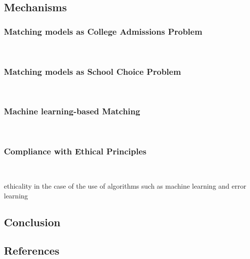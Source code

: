 \documentclass[letterpaper]{article} %
\begin{document}
    \subsection{Mechanisms}

    \subsubsection{Matching models as College Admissions Problem}~\citet{basshuysen}

    \subsubsection{Matching models as School Choice Problem}~\citet{basshuysen}

    \subsubsection{Machine learning-based Matching}~\citet{olbergml}

    \subsubsection{Compliance with Ethical Principles}~\citet{basshuysen}

    ethicality in the case of the use of algorithms such as machine learning and error learning

    \subsection{Conclusion}

    \subsection{References}


    
\end{document}

